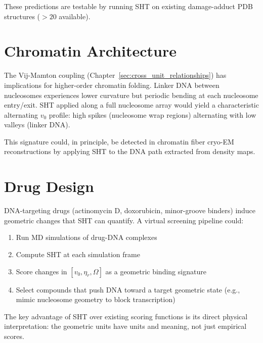 These predictions are testable by running SHT on existing damage-adduct PDB structures ($> 20$ available).

\section{Chromatin Architecture}

The Vij-Mamton coupling (Chapter~\ref{sec:cross_unit_relationships}) has implications for higher-order chromatin folding. Linker DNA between nucleosomes experiences lower curvature but periodic bending at each nucleosome entry/exit. SHT applied along a full nucleosome array would yield a characteristic alternating $v_0$ profile: high spikes (nucleosome wrap regions) alternating with low valleys (linker DNA).

This signature could, in principle, be detected in chromatin fiber cryo-EM reconstructions by applying SHT to the DNA path extracted from density maps.

\section{Drug Design}

DNA-targeting drugs (actinomycin D, doxorubicin, minor-groove binders) induce geometric changes that SHT can quantify. A virtual screening pipeline could:
\begin{enumerate}
    \item Run MD simulations of drug-DNA complexes
    \item Compute SHT at each simulation frame
    \item Score changes in $[v_0, \eta_r, \Omega]$ as a geometric binding signature
    \item Select compounds that push DNA toward a target geometric state (e.g., mimic nucleosome geometry to block transcription)
\end{enumerate}

The key advantage of SHT over existing scoring functions is its direct physical interpretation: the geometric units have units and meaning, not just empirical scores.


